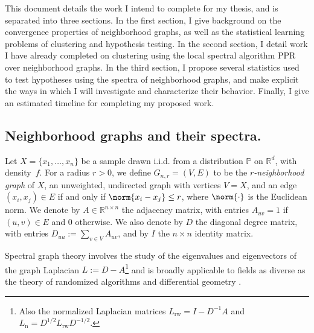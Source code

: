 \documentclass{article}
\newcommand{\Reals}{\mathbb{R}}
\newcommand{\1}{\mathbf{1}}
\newcommand{\Rd}{\Reals^d}
\newcommand{\Pbb}{\mathbb{P}}
\theoremstyle{alden}
\theoremstyle{aldenthm}
\theoremstyle{definition}
\theoremstyle{remark}
\begin{document}
This document details the work I intend to complete for my thesis, and is separated into three sections. In the first section, I give background on the convergence properties of neighborhood graphs, as well as the statistical learning problems of clustering and hypothesis testing. In the second section, I detail work I have already completed on clustering using the local spectral algorithm PPR over neighborhood graphs. In the third section, I propose several statistics used to test hypotheses using the spectra of neighborhood graphs, and make explicit the ways in which I will investigate and characterize their behavior. Finally, I give an estimated timeline for completing my proposed work.

\subsection{Neighborhood graphs and their spectra.}
\label{subsec:neighborhood_graphs_spectra}

Let $X = \{x_1,
\ldots, x_n\}$ be a sample drawn i.i.d. from a distribution $\Pbb$ on $\Rd$,
with density~$f$.  For a radius $r > 0$, we define $G_{n,r}=(V,E)$ to be the
\emph{$r$-neighborhood graph} of $X$, an unweighted, undirected graph with
vertices $V=X$, and an edge $(x_i,x_j) \in E$ if and only if $\norm{x_i -
	x_j} \leq r$, where $\norm{\cdot}$ is the Euclidean norm. We denote by $A \in
\Reals^{n \times n}$ the adjacency matrix, with entries $A_{uv} = 1$ if
$(u,v) \in E$ and $0$ otherwise.  We also denote by $D$ the diagonal degree
matrix, with entries $D_{uu} := \sum_{v \in V} A_{uv}$, and by $I$ the $n
\times n$ identity matrix.

Spectral graph theory involves the study of the eigenvalues and eigenvectors of the graph Laplacian $L := D - A$\footnote{Also the normalized Laplacian matrices $L_{\textrm{rw}} = I - D^{-1}A$ and $L_{\textrm{n}} = D^{1/2}L_{\textrm{rw}}D^{-1/2}$.} and is broadly applicable to fields as diverse as the theory of randomized algorithms and differential geometry \citet{chung97}. 
\end{document}
